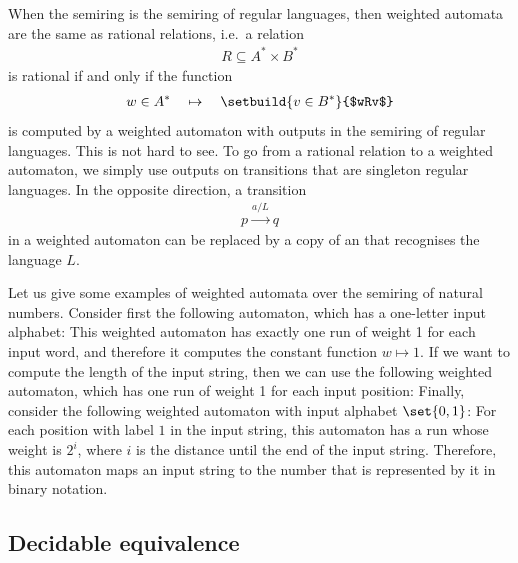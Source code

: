 \begin{myexample}\label{ex:weighted-automata-semiring-regular-languages}
    When the semiring is the semiring of regular languages, then weighted automata are the same as rational relations, i.e.~a relation
    \begin{align*}
    R \subseteq A^* \times B^*
    \end{align*} 
    is rational if and only if the function 
    \begin{align*}
    w \in A^* \quad \mapsto \quad \setbuild{ v \in B^*}{$wRv$}
    \end{align*}
    is computed by a weighted automaton with outputs in the semiring of regular languages. This is not hard to see. To go from a rational relation to a weighted automaton, we simply use outputs on transitions that are singleton regular languages. In the opposite direction, a transition 
    \begin{align*}
      p \xrightarrow {a / L} q
    \end{align*}
    in a weighted automaton can be replaced by a copy of an \nfa that recognises the language $L$. 
\end{myexample}


\begin{myexample} \label{ex:weighted-automata-nat}
    Let us give some examples of weighted automata over the semiring of natural numbers. Consider first the following automaton, which has a one-letter input alphabet:
    This weighted automaton 
    has exactly one run of weight 1 for each input word, and therefore it computes the constant function $w \mapsto 1$. If we want to compute the length of the input string, then we can use the following weighted automaton, which has one run of weight 1 for each input position:
Finally, consider the following weighted automaton with input alphabet $\set{0,1}$:
    For each position with label $1$ in the input string, this automaton has a run whose weight is $2^i$, where $i$ is the distance until the end of the input string. Therefore, this automaton maps an input string to the number that is represented by it in binary notation.
\end{myexample}






\subsection{Decidable equivalence}
\label{sec:decidable-equivalence-rational-functions}

